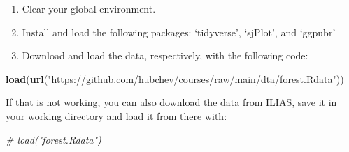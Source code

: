 \documentclass[
  12pt,
  oneside]{book}
\newenvironment{Shaded}{\begin{snugshade}}{\end{snugshade}}
\newcommand{\CommentTok}[1]{\textcolor[rgb]{0.56,0.35,0.01}{\textit{#1}}}
\newcommand{\FunctionTok}[1]{\textcolor[rgb]{0.13,0.29,0.53}{\textbf{#1}}}
\newcommand{\NormalTok}[1]{#1}
\newcommand{\StringTok}[1]{\textcolor[rgb]{0.31,0.60,0.02}{#1}}
\theoremstyle{definition}
\theoremstyle{definition}
\theoremstyle{definition}
\theoremstyle{definition}
\theoremstyle{remark}
\begin{document}
\begin{enumerate}
\def\labelenumi{(\arabic{enumi})}
\setcounter{enumi}{1}
\item
  Clear your global environment.
\item
  Install and load the following packages: `tidyverse', `sjPlot', and `ggpubr'
\item
  Download and load the data, respectively, with the following code:
\end{enumerate}

\begin{Shaded}
\begin{Highlighting}[]
\FunctionTok{load}\NormalTok{(}\FunctionTok{url}\NormalTok{(}\StringTok{"https://github.com/hubchev/courses/raw/main/dta/forest.Rdata"}\NormalTok{))}
\end{Highlighting}
\end{Shaded}

If that is not working, you can also download the data from ILIAS, save it in
your working directory and load it from there with:

\begin{Shaded}
\begin{Highlighting}[]
\CommentTok{\# load("forest.Rdata")}
\end{Highlighting}
\end{Shaded}
\end{document}
